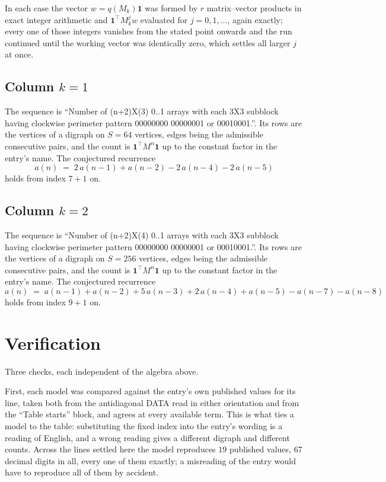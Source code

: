 \documentclass[11pt,a4paper]{article}
\theoremstyle{plain}
\theoremstyle{definition}
\begin{document}
In each case the vector $w=q(M_k)\mathbf{1}$ was formed by $r$ matrix--vector products in
exact integer arithmetic and $\mathbf{1}^{\!\top}M_k^{j}w$ evaluated for $j=0,1,\dots$,
again exactly; every one of those integers vanishes from the stated point onwards and the run
continued until the working vector was identically zero, which settles all larger $j$ at once.

\subsection*{Column $k$$=1$}
The sequence is ``Number of (n+2)X(3) 0..1 arrays with each 3X3 subblock having clockwise perimeter pattern 00000000 00000001 or 00010001.''. Its rows are the vertices of a digraph on
$S=64$ vertices, edges being the admissible consecutive pairs, and the count is
$\mathbf{1}^{\!\top}M^{n}\mathbf{1}$ up to the constant factor in the entry's name.
The conjectured recurrence
\[
a(n)\;=\;2\,a(n-1) + a(n-2) - 2\,a(n-4) - 2\,a(n-5)
\]
holds from index $7+1$ on.

\subsection*{Column $k$$=2$}
The sequence is ``Number of (n+2)X(4) 0..1 arrays with each 3X3 subblock having clockwise perimeter pattern 00000000 00000001 or 00010001.''. Its rows are the vertices of a digraph on
$S=256$ vertices, edges being the admissible consecutive pairs, and the count is
$\mathbf{1}^{\!\top}M^{n}\mathbf{1}$ up to the constant factor in the entry's name.
The conjectured recurrence
\[
a(n)\;=\;a(n-1) + a(n-2) + 5\,a(n-3) + 2\,a(n-4) + a(n-5) - a(n-7) - a(n-8)
\]
holds from index $9+1$ on.

\section{Verification}

Three checks, each independent of the algebra above.

First, each model was compared against the entry's own published values for its line, taken
both from the antidiagonal DATA read in either orientation and from the ``Table starts''
block, and agrees at every available term. This is what ties a model to the table:
substituting the fixed index into the entry's wording is a reading of English, and a wrong
reading gives a different digraph and different counts. Across the lines settled here the
model reproduces $19$ published values, $67$ decimal digits in all, every one of
them exactly; a misreading of the entry would have to reproduce all of them by accident.
\end{document}

